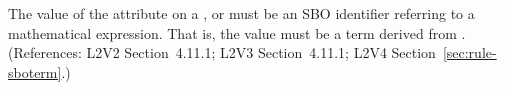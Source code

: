 The value of the  attribute on a \AlgebraicRule, \RateRule or
\AssignmentRule must be an SBO identifier referring to a mathematical
expression.  That is, the value must be a term derived from
\sbomathformula.  (References: L2V2 Section~4.11.1;
L2V3 Section~4.11.1; L2V4 Section~\ref{sec:rule-sboterm}.)
